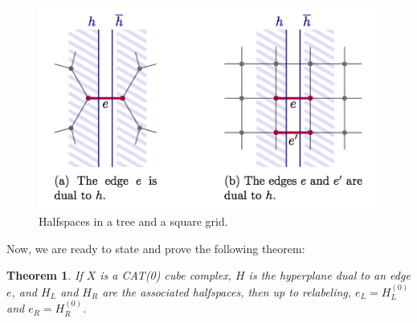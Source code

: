 \documentclass[12pt, a4paper]{article}
\theoremstyle{plain}
\newtheorem{theorem}{Theorem}[section]
\theoremstyle{definition}
\newtheorem{definition}[theorem]{Definition}
\theoremstyle{remark}
\begin{document}
    
    \begin{figure}[H]
        \centering
        \includegraphics[width=0.6\linewidth]{halfspaces}
        \caption{Halfspaces in a tree and a square grid. \cite{loeh}}
    \end{figure}
    
    Now, we are ready to state and prove the following theorem:
    
    \begin{theorem}
        If $X$ is a CAT(0) cube complex, $H$ is the hyperplane dual to an edge $e$, and $H_{L}$ and $H_{R}$ are the associated halfspaces, then up to relabeling, $e_{L} = H_{L}^{(0)}$ and $e_{R} = H_{R}^{(0)}$.
    \end{theorem}
    
\end{document}
